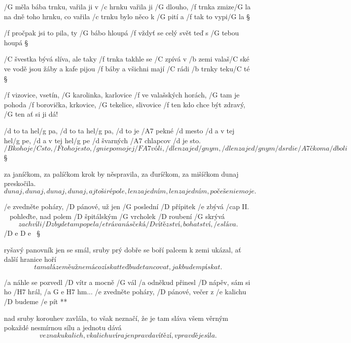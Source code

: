 
/G měla bába trnku, vařila ji v /c hrnku
vařila ji /G dlouho, /f trnka zmize/G la
na dně toho hrnku, co vařila /c trnku
bylo něco k /G pití a /f tak to vypi/G la \S

/f pročpak jsi to pila, ty /G bábo hloupá
/f vždyť se celý svět teď s /G tebou houpá \S

/C švestka bývá slíva, ale taky /f trnka
takhle se /C zpívá v /b zemi valaš/C ské
ve vodě jsou žáby a kafe pijou /f báby
a všichni mají /C rádi /b trnky teku/C té \S

/f vizovice, vsetín, /G karolinka, karlovice
/f ve valašských horách, /G tam je pohoda
/f borovička, krkovice, /G tekelice, slivovice
/f ten kdo chce být zdravý, /G ten ať si ji dá!






/d to ta hel/g pa, /d to ta hel/g pa, /d to je /A7 pekné /d mesto
/d a v tej hel/g pe, /d a v tej hel/g pe /d švarných /A7 chlapcov /d je sto.
\[ /B koho je /C sto, /F toho je sto, /g nie po mojej /{F A7} vóli,
/d len za jed/g nym, /d len za jed/g nym /d srdie/A7 čko ma /d boli \] \S

za janíčkom, za palíčkom krok by něspravila,
za ďuríčkom, za mišíčkom dunaj preskočila.
\[ dunaj, dunaj, dunaj, dunaj, aj to širé pole,
len za jedním, len za jedním, počešenie moje. \]




/e zvedněte poháry, /D pánové, už jen /G poslední /D přípitek /e zbývá /{cap II.} ~
pohleďte, nad polem /D špitálským /G vrcholek /D roubení /G skrývá
\[ za chvíli /D zbyde tam popel a /e tráva
    nás čeká /D vítězství, bohatství, /e sláva. \] /{D e D e} ~\S

ryšavý panovník jen se smál, sruby prý dobře se boří
palcem k zemi ukázal, ať další hranice hoří
\[ ta malá země už nemá co získat
teď bude tancovat, jak budem pískat. \]

\R  /a náhle se pozvedl /D vítr a mocně /G vál
    /a odněkud přinesl /D nápěv, sám si ho /H7 hrál, /{a G e H7} hm...
    /e zvedněte poháry, /D pánové, večer z /e kalichu /D budeme /e pít **

nad sruby korouhev zavlála, to však neznačí, že je tam sláva
všem věrným pokaždé nesmírnou sílu a jednotu dává
\[ ve znaku kalich, v kalichu víra
jen pravda vítězí, v pravdě je síla. \] \s

